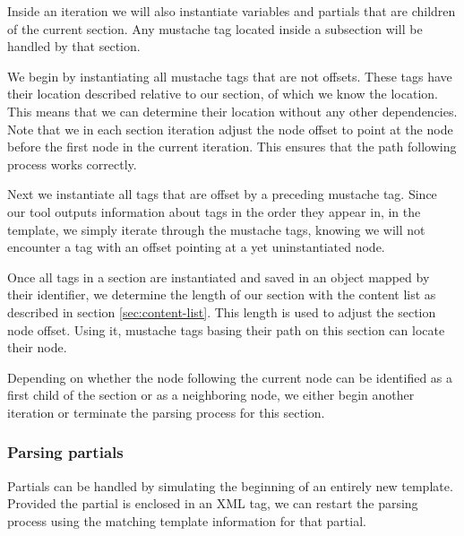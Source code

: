 \documentclass[thesis.tex]{subfiles}
\begin{document}
Inside an iteration we will also instantiate variables and partials that are
children of the current section. Any mustache tag located inside a subsection
will be handled by that section.

We begin by instantiating all mustache tags that are not offsets. These
tags have their location described relative to our section, of which we know the
location. This means that we can determine their location without any other
dependencies.
Note that we in each section iteration adjust the node offset
to point at the node before the first node in the current iteration.
This ensures that the path following process works correctly.

Next we instantiate all tags that are offset by a preceding mustache tag.
Since our tool outputs information about tags in the order they appear in, in the
template, we simply iterate through the mustache tags, knowing we will not
encounter a tag with an offset pointing at a yet uninstantiated node.

Once all tags in a section are instantiated and saved in an object mapped by
their identifier, we determine the length of our section with the content list
as described in section \ref{sec:content-list}. This length is used to adjust
the section node offset. Using it, mustache tags basing their path on this
section can locate their node.

Depending on whether the node following the current node can be identified as
a first child of the section or as a neighboring node, we either begin another
iteration or terminate the parsing process for this section.

\subsubsection{Parsing partials}
\label{sec:parsing-partials}
Partials can be handled by simulating the beginning of an entirely new template.
Provided the partial is enclosed in an XML tag, we can
restart the parsing process using the matching template information for that
partial.
\end{document}
